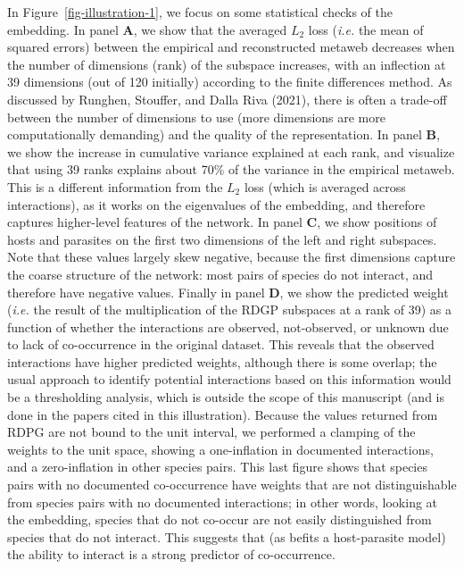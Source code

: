 \documentclass[
  letterpaper,
  DIV=11,
  numbers=noendperiod]{scrartcl}
\begin{document}
In Figure~\ref{fig-illustration-1}, we focus on some statistical checks
of the embedding. In panel \textbf{A}, we show that the averaged \(L_2\)
loss (\emph{i.e.} the mean of squared errors) between the empirical and
reconstructed metaweb decreases when the number of dimensions (rank) of
the subspace increases, with an inflection at 39 dimensions (out of 120
initially) according to the finite differences method. As discussed by
Runghen, Stouffer, and Dalla Riva (2021), there is often a trade-off
between the number of dimensions to use (more dimensions are more
computationally demanding) and the quality of the representation. In
panel \textbf{B}, we show the increase in cumulative variance explained
at each rank, and visualize that using 39 ranks explains about 70\% of
the variance in the empirical metaweb. This is a different information
from the \(L_2\) loss (which is averaged across interactions), as it
works on the eigenvalues of the embedding, and therefore captures
higher-level features of the network. In panel \textbf{C}, we show
positions of hosts and parasites on the first two dimensions of the left
and right subspaces. Note that these values largely skew negative,
because the first dimensions capture the coarse structure of the
network: most pairs of species do not interact, and therefore have
negative values. Finally in panel \textbf{D}, we show the predicted
weight (\emph{i.e.} the result of the multiplication of the RDGP
subspaces at a rank of 39) as a function of whether the interactions are
observed, not-observed, or unknown due to lack of co-occurrence in the
original dataset. This reveals that the observed interactions have
higher predicted weights, although there is some overlap; the usual
approach to identify potential interactions based on this information
would be a thresholding analysis, which is outside the scope of this
manuscript (and is done in the papers cited in this illustration).
Because the values returned from RDPG are not bound to the unit
interval, we performed a clamping of the weights to the unit space,
showing a one-inflation in documented interactions, and a zero-inflation
in other species pairs. This last figure shows that species pairs with
no documented co-occurrence have weights that are not distinguishable
from species pairs with no documented interactions; in other words,
looking at the embedding, species that do not co-occur are not easily
distinguished from species that do not interact. This suggests that (as
befits a host-parasite model) the ability to interact is a strong
predictor of co-occurrence.
\end{document}
